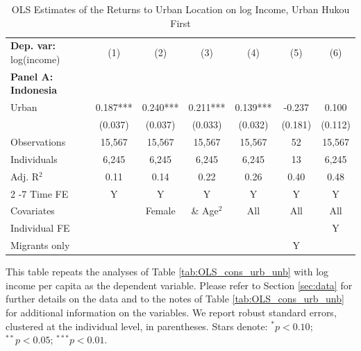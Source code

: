 \begin{table}[htbp] \centering \begin{threeparttable}
 \caption{OLS Estimates of the Returns to Urban Location on log Income, Urban Hukou First} 
 \label{tab:OLS_CHN_hukou_urban_first_income_urban_unb} 
\begin{tabular}{l cccccc} \toprule  \textbf{Dep. var:}  log(income) 
                    &\multicolumn{1}{c}{(1)}   &\multicolumn{1}{c}{(2)}   &\multicolumn{1}{c}{(3)}   &\multicolumn{1}{c}{(4)}   &\multicolumn{1}{c}{(5)}   &\multicolumn{1}{c}{(6)}   \\
\textbf{Panel A: Indonesia} \\
Urban               &       0.187***&       0.240***&       0.211***&       0.139***&      -0.237   &       0.100   \\
                    &     (0.037)   &     (0.037)   &     (0.033)   &     (0.032)   &     (0.181)   &     (0.112)   \\
\addlinespace
Observations        &      15,567   &      15,567   &      15,567   &      15,567   &          52   &      15,567   \\
Individuals         &       6,245   &       6,245   &       6,245   &       6,245   &          13   &       6,245   \\
Adj. R$^{2}$        &        0.11   &        0.14   &        0.22   &        0.26   &        0.40   &        0.48   \\
\cmidrule{2 -7} Time FE & Y & Y & Y & Y & Y & Y \\ Covariates & & Female & \& Age$^2$ & All & All & All \\ Individual FE & & & & & & Y \\ Migrants only & & & & & Y & \\ \bottomrule \end{tabular} \begin{tablenotes}[flushleft] \footnotesize \item{This table repeats the analyses of Table \ref{tab:OLS_cons_urb_unb} with log income per capita as the dependent variable. Please refer to Section \ref{sec:data} for further details on the data and to the notes of Table \ref{tab:OLS_cons_urb_unb} for additional information on the variables. We report robust standard errors, clustered at the individual level, in parentheses. Stars denote: $^{*} p<0.10$; $^{**} p<0.05$; $^{***} p<0.01$.} \end{tablenotes} \end{threeparttable} \end{table}
